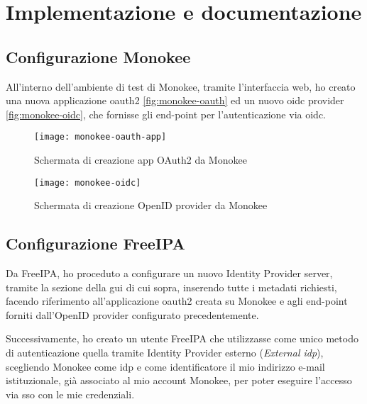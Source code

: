 
\chapter{Implementazione e documentazione}
\label{cap:implementazione-documentazione}



\section{Configurazione Monokee}
All'interno dell'ambiente di test di Monokee, tramite l'interfaccia web, ho creato una nuova applicazione \acrshort{oauth2}\cite{site:oauth-flow} \autoref{fig:monokee-oauth} ed un nuovo \acrshort{oidc} provider \autoref{fig:monokee-oidc}, che fornisse gli end-point per l'autenticazione via \acrshort{oidc}\cite{site:monokee-docs}.


\begin{figure}[!h] 
    \centering 
    \texttt{[image: monokee-oauth-app]} 
    \caption{Schermata di creazione app OAuth2 da Monokee}
    \label{fig:monokee-oauth}
\end{figure}

\begin{figure}[!h] 
    \centering 
    \texttt{[image: monokee-oidc]} 
    \caption{Schermata di creazione OpenID provider da Monokee}
    \label{fig:monokee-oidc}
\end{figure}

\section{Configurazione FreeIPA}
Da FreeIPA, ho proceduto a configurare un nuovo Identity Provider server, tramite la sezione della \acrfull{gui} di cui sopra, inserendo tutte i metadati richiesti, facendo riferimento all'applicazione \acrshort{oauth2} creata su Monokee e agli end-point forniti dall'OpenID provider configurato precedentemente.

Successivamente, ho creato un utente FreeIPA che utilizzasse come unico metodo di autenticazione quella tramite Identity Provider esterno (\emph{External \acrshort{idp}}), scegliendo Monokee come \acrshort{idp} e come identificatore il mio indirizzo e-mail istituzionale, già associato al mio account Monokee, per poter eseguire l'accesso via \acrshort{sso} con le mie credenziali\cite{site:using-ext-idp-idm}.  

